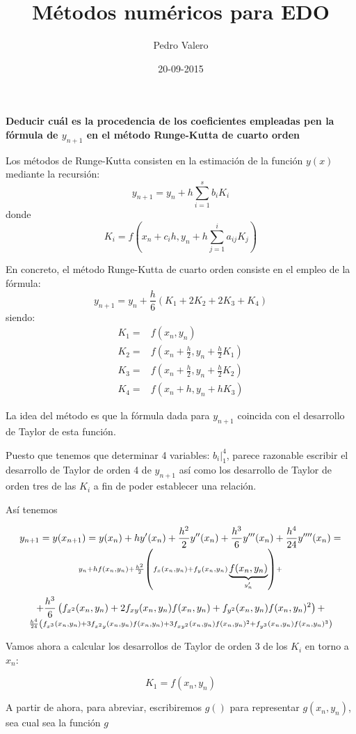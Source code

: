 \documentclass[nochap]{apuntes}
\title{Métodos numéricos para EDO}
\author{Pedro Valero}
\date{20-09-2015}
\begin{document}
\pagestyle{plain}

\textbf{Deducir cuál es la procedencia de los coeficientes empleadas pen la fórmula de $y_{n+1}$ en el método Runge-Kutta de cuarto orden}

Los métodos de Runge-Kutta consisten en la estimación de la función $y(x)$ mediante la recursión:
\[y_{n+1} = y_n+ h \sum_{i=1}^s b_i K_i\]
donde
\[K_i = f\left(x_n+c_ih, y_n+h \sum_{j=1}^ia_{ij}K_j\right)\]

En concreto, el método Runge-Kutta de cuarto orden consiste en el empleo de la fórmula:
\[y_{n+1} = y_n +\frac{h}{6}(K_1+2K_2+2K_3+K_4)\]
siendo:
\[
\begin{array}{ll}
K_1 = & f(x_n,y_n)\\
K_2 = & f(x_n+\frac{h}{2}, y_n+\frac{h}{2}K_1)\\
K_3 = & f(x_n+\frac{h}{2}, y_n + \frac{h}{2}K_2)\\
K_4 = & f(x_n+h, y_n + h K_3)
\end{array}
\]

La idea del método es que la fórmula dada para $y_{n+1}$ coincida con el desarrollo de Taylor de esta función.

Puesto que tenemos que determinar 4 variables: $b_i|_1^4$, parece razonable escribir el desarrollo de Taylor de orden 4 de $y_{n+1}$ así como los desarrollo de Taylor de orden tres de las $K_i$ a fin de poder establecer una relación.

Así tenemos

\[y_{n+1} = y(x_{n+1}) = y(x_n) +h y'(x_n)+\frac{h^2}{2}y''(x_n)+\frac{h^3}{6}y'''(x_n) + \frac{h^4}{24}y''''(x_n)= \atop y_n + h f(x_n,y_n)+\frac{h^2}{2}\left(f_x(x_n,y_n)+f_y(x_n,y_n)\underbrace{f(x_n,y_n)}_{y_n'}\right)  + \]
\[+\frac{h^3}{6}\left( f_{x^2}(x_n,y_n)+2f_{xy}(x_n,y_n)f(x_n,y_n)+f_{y^2}(x_n,y_n)f(x_n,y_n)^2\right) +\atop \frac{h^4}{24} \left(f_{x^3}(x_n,y_n)+3f_{x^2y}(x_n,y_n)f(x_n,y_n)+3f_{xy^2}(x_n,y_n)f(x_n,y_n)^2+f_{y^3}(x_n,y_n)f(x_n,y_n)^3\right)\]

Vamos ahora a calcular los desarrollos de Taylor de orden 3 de los $K_i$ en torno a $x_n$:

\[K_1 = f(x_n,y_n)\]

\begin{remark}
A partir de ahora, para abreviar, escribiremos $g()$ para representar $g(x_n,y_n)$, sea cual sea la función $g$
\end{remark}
\end{document}
